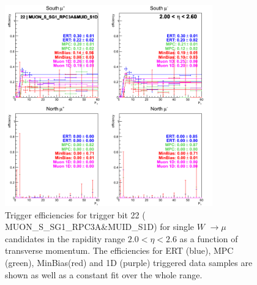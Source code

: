 \begin{figure}[h!]

  \centering

  \includegraphics[width=0.8\textwidth]{./figures/run13_trigeffipt_eta2_trig22_lin.png}
  \caption{\label{fig:run13_trigeffipt_eta2_nper0_trig22_lin} Trigger efficiencies for trigger bit 22 ( MUON\_S\_SG1\_RPC3A\&MUID\_S1D) for single $W$ $\rightarrow \mu$ candidates in the rapidity range $ 2.0 < \eta < 2.6$ as a function of transverse momentum. The efficiencies for ERT (blue), MPC (green), MinBias(red) and 1D (purple) triggered data samples are shown as well as a constant fit over the whole range.}

\end{figure}
\clearpage
